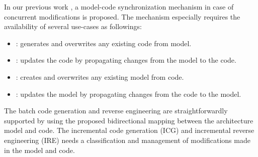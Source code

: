 In our previous work \cite{foster2016}, a model-code synchronization mechanism in case of concurrent modifications is proposed.
The mechanism especially requires the availability of several use-cases as followings:

\begin{itemize}[\footnotesize]
	\itemsep0em 
	\item {}: generates and overwrites any existing code from model.
	
	\item {}: updates the code by propagating changes from the model to the code.
	
	\item {}: creates and overwrites any existing model from code.
	
	\item {}: updates the model by propagating changes from the code to the model.
\end{itemize}


The batch code generation and reverse engineering are straightforwardly supported by using the proposed bidirectional mapping between the architecture model and code. 
The incremental code generation (ICG) and incremental reverse engineering (IRE) needs a classification and management of modifications made in the model and code.

